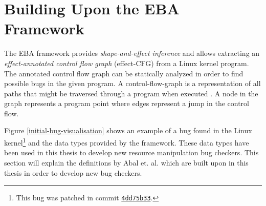 \section{Building Upon the EBA Framework}
The EBA framework provides \textit{shape-and-effect inference} and allows extracting an \textit{effect-annotated control flow graph} (effect-CFG) from a Linux kernel program. The annotated control flow graph can be statically analyzed in order to find possible bugs in the given program. A control-flow-graph is a representation of all paths that might be traversed through a program when executed \cite{cfg}. A node in the graph represents a program point where edges represent a jump in the control flow. 

\newpar Figure \ref{initial-bug-visualisation} shows an example of a bug found in the Linux kernel\footnote{This bug was patched in commit \href{https://github.com/torvalds/linux/commit/4dd75b33}{\texttt{4dd75b33}}.} and the data types provided by the framework. These data types have been used in this thesis to develop new resource manipulation bug checkers. This section will explain the definitions by Abal et. al. \cite{Abal2017EffectiveBF} which are built upon in this thesis in order to develop new bug checkers. 

